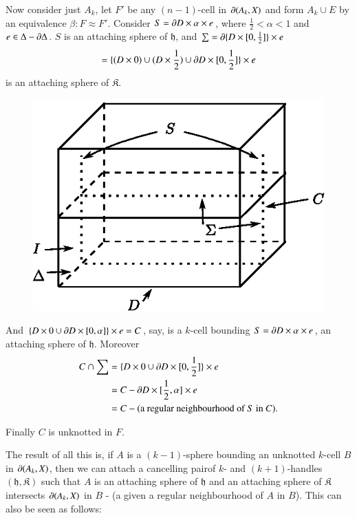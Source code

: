 Now consider just $A_{k}$, let $F'$ be any $(n-1)$-cell in $\partial (A_{k},X)$ and form  $A_{k}\cup E$ by an equivalence $\beta:F\approx F'$. Consider $S=\partial D\times \alpha \times e$, where $\frac{1}{2}<\alpha<1$ and $e\in \Delta -\partial \Delta$. $S$ is an attaching sphere of $\mathfrak{h}$, and $\sum =\partial\{D\times[0,\frac{1}{2}]\}\times e$
$$
=\{(D\times 0)\cup (D\times \frac{1}{2})\cup \partial D\times [0,\frac{1}{2}]\}\times e
$$
is an attaching sphere of $\mathfrak{K}$.
\begin{figure}[H]
\centering
\includegraphics{figure/fig27.eps}
\end{figure}

And $\{D\times 0\cup \partial D\times[0,\alpha]\}\times e=C$, say, is a $k$-cell bounding $S=\partial D\times \alpha\times e$, an attaching sphere of $\mathfrak{h}$. Moreover
\begin{align*}
C\cap\sum &= \{D\times 0\cup \partial D\times [0,\frac{1}{2}]\}\times e\\
&= C-\partial D\times [\frac{1}{2},\alpha]\times e\\
&= C-(\text{a regular neighbourhood of $S$ in $C$}).
\end{align*}

Finally $C$ is unknotted in $F$.

The result of all this is, if $A$ is a $(k-1)$-sphere bounding an unknotted $k$-cell $B$ in $\partial(A_{k},X)$, then we can attach a cancelling pair\pageoriginale of $k$- and $(k+1)$-handles $(\mathfrak{h},\mathfrak{K})$ such that $A$ is an attaching sphere of $\mathfrak{h}$ and an attaching sphere of $\mathfrak{K}$ intersects $\partial(A_{k},X)$ in $B$ - (a given a regular neighbourhood of $A$ in $B$). This can also be seen as follows:

